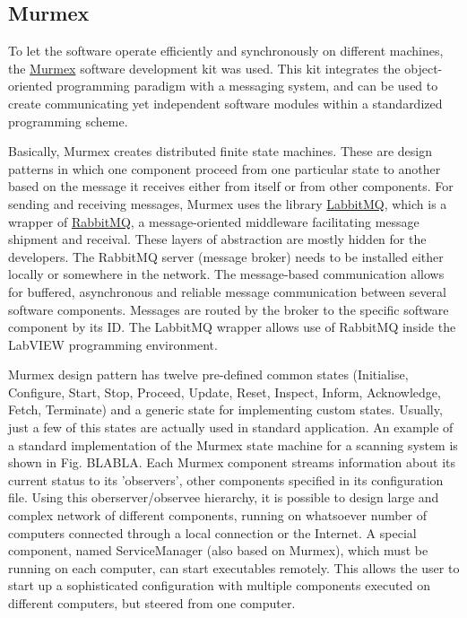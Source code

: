 \documentclass[12pt]{spieman}  %
\begin{document}
\subsection{Murmex}
To let the software operate efficiently and synchronously on different machines, the \href{http://sine.ni.com/nips/cds/view/p/lang/en/nid/212895}{Murmex} software development kit was used. This kit integrates the object-oriented programming paradigm with a messaging system, and can be used to create communicating yet independent software modules within a standardized programming scheme.

Basically, Murmex creates distributed finite state machines. These are design patterns in which one component proceed from one particular state to another based on the message it receives either from itself or from other components. For sending and receiving messages, Murmex uses the library \href{http://sine.ni.com/nips/cds/view/p/lang/en/nid/211065}{LabbitMQ}, which is a wrapper of \href{http://www.rabbitmq.com/}{RabbitMQ}, a message-oriented middleware facilitating message shipment and receival. These layers of abstraction are mostly hidden for the developers. The RabbitMQ server (message broker) needs to be installed either locally or somewhere in the network. The message-based communication allows for buffered, asynchronous and reliable message communication between several software components. Messages are routed by the broker to the specific software component by its ID. The LabbitMQ wrapper allows use of RabbitMQ inside the LabVIEW programming environment.

Murmex design pattern has twelve pre-defined common states (Initialise, Configure, Start, Stop, Proceed, Update, Reset, Inspect, Inform, Acknowledge, Fetch, Terminate) and a generic state for implementing custom states. Usually, just a few of this states are actually used in standard application. An example of a standard implementation of the Murmex state machine for a scanning system is shown in Fig. BLABLA. Each Murmex component streams information about its current status to its 'observers', other components specified in its configuration file. Using this oberserver/observee hierarchy, it is possible to design large and complex network of different components, running on whatsoever number of computers connected through a local connection or the Internet. A special component, named ServiceManager (also based on Murmex), which must be running on each computer, can start executables remotely. This allows the user to start up a sophisticated configuration with multiple components executed on different computers, but steered from one computer.
\end{document}
